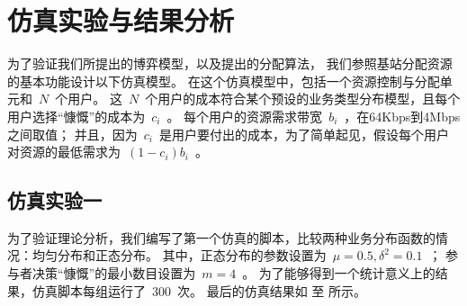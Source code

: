 \section{仿真实验与结果分析}
为了验证我们所提出的博弈模型，以及提出的分配算法，
我们参照基站分配资源的基本功能设计以下仿真模型。
在这个仿真模型中，包括一个资源控制与分配单元和~$N$~个用户。
这~$N$~个用户的成本符合某个预设的业务类型分布模型，且每个用户选择“慷慨”的成本为~$c_i$~。
每个用户的资源需求带宽~$b_i$~，在64Kbps到4Mbps之间取值；
并且，因为~$c_i$~是用户要付出的成本，为了简单起见，假设每个用户对资源的最低需求为~$(1-c_i)b_i$~。

\subsection{仿真实验一}
为了验证理论分析，我们编写了第一个仿真的脚本，比较两种业务分布函数的情况：均匀分布和正态分布。
其中，正态分布的参数设置为~$\mu = 0.5, \delta^2 = 0.1$~；
参与者决策“慷慨”的最小数目设置为~$m=4$~。
为了能够得到一个统计意义上的结果，仿真脚本每组运行了~$300$~次。
最后的仿真结果如
至
所示。
